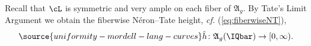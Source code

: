 


Recall that $\cL$ is symmetric and very ample on each fiber of
$\mathfrak{A}_{g}$.
By Tate's Limit Argument we obtain the fiberwise N\'eron--Tate height,
\textit{cf.} (\ref{eq:fiberwiseNT}),
\begin{equation}
 \label{eq:NTfinemoduli}
\source{uniformity-mordell-lang-curves}
  \hat h \colon \mathfrak{A}_{g}(\IQbar)\rightarrow [0,\infty).
\end{equation}




